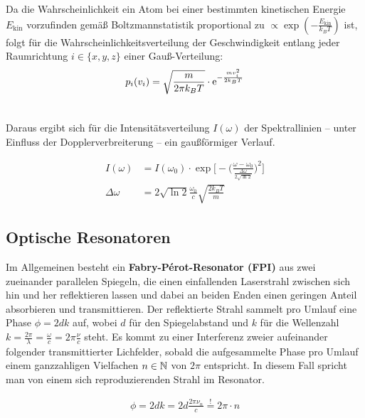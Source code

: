 \noindent Da die Wahrscheinlichkeit ein Atom bei einer bestimmten kinetischen Energie $E_{\text{kin}}$ vorzufinden gemäß Boltzmannstatistik proportional zu $\propto \exp(-\frac{E_{\text{kin}}}{k_{B}T})$ ist, folgt für die Wahrscheinlichkeitsverteilung der Geschwindigkeit entlang jeder Raumrichtung $i \in \{x,y,z\}$ einer Gauß-Verteilung:\\

\begin{align}
    p_{i}(v_{i}) = \sqrt{\frac{m}{2\pi k_{B}T}} \cdot \mathrm{e}^{- \frac{mv_{i}^2}{2k_{B}T}} \label{eq:Gaußverteilte Geschwindigkeit}\\\nonumber
\end{align}

\noindent Daraus ergibt sich für die Intensitätsverteilung $I(\omega)$ der Spektrallinien -- unter Einfluss der Dopplerverbreiterung -- ein gaußförmiger Verlauf. \cite{H2}

\begin{align}
    I(\omega) &= I(\omega_{0}) \cdot \exp \biggl[- \biggl(\frac{\omega-\omega_{0}}{\frac{\Delta \omega}{2\sqrt{\ln{2}}}}\biggr)^2 \biggr] \label{eq:gauss-intensity} \\
    \Delta \omega &= 2\sqrt{\ln 2} \frac{\omega_{0}}{c}\sqrt{\frac{2k_{B}T}{m}} \label{eq:delta-omega}
\end{align}
\newpage
\subsection{Optische Resonatoren}

\noindent Im Allgemeinen besteht ein \textbf{Fabry-Pérot-Resonator (FPI)} aus zwei zueinander parallelen Spiegeln, die einen einfallenden Laserstrahl zwischen sich hin und her reflektieren lassen und dabei an beiden Enden einen geringen Anteil absorbieren und transmittieren. Der reflektierte Strahl sammelt pro Umlauf eine Phase $\phi=2dk$ auf, wobei $d$ für den Spiegelabstand und $k$ für die Wellenzahl $k=\frac{2\pi}{\lambda}=\frac{\omega}{c}=2\pi\frac{\nu}{c}$ steht. Es kommt zu einer Interferenz zweier aufeinander folgender transmittierter Lichfelder, sobald die aufgesammelte Phase pro Umlauf einem ganzzahligen Vielfachen $n\in \mathbb{N}$ von $2\pi$ entspricht. In diesem Fall spricht man von einem sich reproduzierenden Strahl im Resonator.

\begin{align}
    \phi=2dk = 2d \frac{2\pi \nu_{n}}{c} \overset{!}{=} 2\pi \cdot n \label{eq:Interferenzbedingung}
\end{align}

